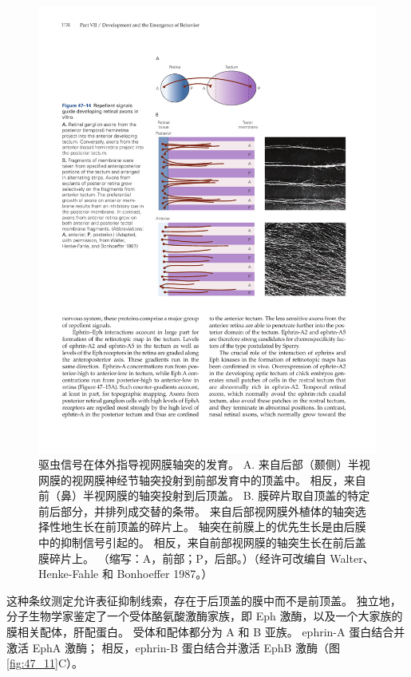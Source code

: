 \begin{figure}[htbp]
	\centering
	\includegraphics[width=0.75\linewidth]{chap47/fig_47_14}
	\caption{驱虫信号在体外指导视网膜轴突的发育。 A. 来自后部（颞侧）半视网膜的视网膜神经节轴突投射到前部发育中的顶盖中。 相反，来自前（鼻）半视网膜的轴突投射到后顶盖。 B. 膜碎片取自顶盖的特定前后部分，并排列成交替的条带。 来自后部视网膜外植体的轴突选择性地生长在前顶盖的碎片上。 轴突在前膜上的优先生长是由后膜中的抑制信号引起的。 相反，来自前部视网膜的轴突生长在前后盖膜碎片上。 （缩写：A，前部；P，后部。）（经许可改编自 Walter、Henke-Fahle 和 Bonhoeffer 1987。）}
	\label{fig:47_14}
\end{figure}

这种条纹测定允许表征抑制线索，存在于后顶盖的膜中而不是前顶盖。 独立地，分子生物学家鉴定了一个受体酪氨酸激酶家族，即 Eph 激酶，以及一个大家族的膜相关配体，肝配蛋白。 受体和配体都分为 A 和 B 亚族。 
ephrin-A 蛋白结合并激活 EphA 激酶； 相反，ephrin-B 蛋白结合并激活 EphB 激酶（图 \ref{fig:47_11}C）。

